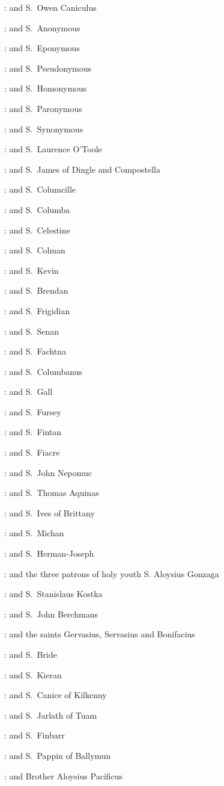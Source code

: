 :
and S.~Owen Caniculus 

:
and S.~Anonymous 

:
and S.~Eponymous 

:
and S.~Pseudonymous 

:
and S.~Homonymous 

:
and S.~Paronymous 

:
and S.~Synonymous 

:
and S.~Laurence O'Toole 

:
and S.~James of Dingle and Compostella 

:
and S.~Columcille 

:
and S.~Columba 

:
and S.~Celestine 

:
and S.~Colman 

:
and S.~Kevin 

:
and S.~Brendan 

:
and S.~Frigidian 

:
and S.~Senan 

:
and S.~Fachtna 

:
and S.~Columbanus 

:
and S.~Gall 

:
and S.~Fursey 

:
and S.~Fintan 

:
and S.~Fiacre 

:
and S.~John Nepomuc 

:
and S.~Thomas Aquinas 

:
and S.~Ives of Brittany 

:
and S.~Michan 

:
and S.~Herman-Joseph 

:
and the three patrons of holy youth
S. Aloysius Gonzaga 

:
and S.~Stanislaus Kostka 

:
and S.~John Berchmans 

:
and the saints Gervasius,
Servasius
and Bonifacius 

:
and S.~Bride 

:
and S.~Kieran 

:
and S.~Canice of Kilkenny 

:
and S.~Jarlath of Tuam 

:
and S.~Finbarr 

:
and S.~Pappin of Ballymun 

:
and Brother Aloysius Pacificus 

